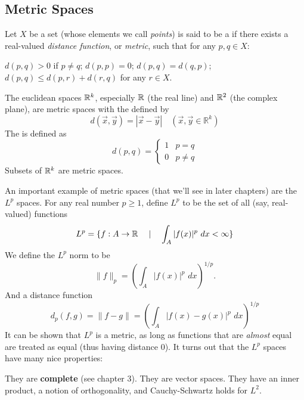 \documentclass{article}
\begin{document}
\subsection{Metric Spaces}
\begin{definition}
    Let $X$ be a set (whose elements we call \textit{points}) is said to be a  if there exists a real-valued \textit{distance function}, or \textit{metric}, such that for any $p,q\in X$:
    \begin{enumerate}
        \ii $d(p,q)>0$ if $p\neq q$; $d(p,p)=0$;
        \ii $d(p,q)=d(q,p)$;
        \ii $d(p,q)\leq d(p,r)+d(r,q)$ for any $r\in X$.
    \end{enumerate}
\end{definition}
\begin{example}
    \listhack 
    \begin{enumerate}
        \ii The euclidean spaces $\mathbb R^{k}$, especially $\mathbb R$ (the real line) and $\mathbb R^{2}$ (the complex plane), are metric spaces with the  defined by
        \[d(\vec{x},\vec{y})=|\vec{x}-\vec{y}|\quad(\vec{x},\vec{y}\in\mathbb{R}^{k}) \]
        \ii The  is defined as \[d(p,q)=\begin{cases}
            1 & p=q\\
            0 & p \neq q
        \end{cases}\]
        \ii  Subsets of $\mathbb R^{k}$ are metric spaces.
    \end{enumerate}

\end{example}
\begin{example}[$L^{p}$ spaces]
        An important example of metric spaces (that we'll see in later chapters) are the $L^{p}$ spaces. For any real number $p\geq 1$, define $L^{p}$ to be the set of all (say, real-valued) functions
        \[L^{p}=\{f:A\rightarrow \mathbb R \quad\mid\quad \int_{A} |f(x)|^{p}\,\,dx < \infty\}\]
        We define the $L^{p}$ norm to be \[\lVert f\rVert_{p}=\left(\int_{A}|f(x)|^{p}\,\,dx\right)^{1/p}.\]
        And a distance function \[d_{p}(f,g)=\lVert f - g\rVert=\left(\int_{A}|f(x)-g(x)|^{p}\,\,dx\right)^{1/p}\]
        It can be shown that $L^{p}$ is a metric, as long as functions that are \textit{almost} equal are treated as equal (thus having distance 0). It turns out that the $L^p$ spaces have many nice properties:
        \begin{itemize}
            \ii They are \textbf{complete} (see chapter 3).
            \ii They are vector spaces.
            \ii They have an inner product, a notion of orthogonality, and Cauchy-Schwartz holds for $L^{2}$.
        \end{itemize}   
\end{example}
\end{document}
